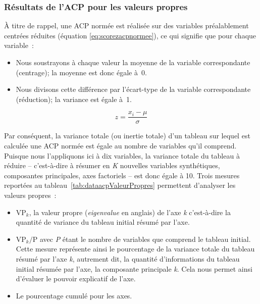 \documentclass[
  11pt,
  french,
]{book}
\providecommand{\tightlist}{%
  \setlength{\itemsep}{0pt}\setlength{\parskip}{0pt}}
\begin{document}
\hypertarget{sect12221}{%
\subsubsection{Résultats de l'ACP pour les valeurs propres}\label{sect12221}}

À titre de rappel, une ACP normée est réalisée sur des variables préalablement centrées réduites (équation \eqref{eq:scorezacpnormee}), ce qui signifie que pour chaque variable~:

\begin{itemize}
\tightlist
\item
  Nous soustrayons à chaque valeur la moyenne de la variable correspondante (centrage); la moyenne est donc égale à~0.
\item
  Nous divisons cette différence par l'écart-type de la variable correspondante (réduction); la variance est égale à~1.
\end{itemize}

\footnotesize

\begin{equation}  
z= \frac{x_i-\mu}{\sigma}
\label{eq:scorezacpnormee}
\end{equation}
\normalsize

Par conséquent, la variance totale (ou inertie totale) d'un tableau sur lequel est calculée une ACP normée est égale au nombre de variables qu'il comprend. Puisque nous l'appliquons ici à dix variables, la variance totale du tableau à réduire -- c'est-à-dire à résumer en \emph{K} nouvelles variables synthétiques, composantes principales, axes factoriels -- est donc égale à 10. Trois mesures reportées au tableau~\ref{tab:dataacpValeurPropres} permettent d'analyser les valeurs propres~:

\begin{itemize}
\tightlist
\item
  \(\mbox{VP}_k\), la valeur propre (\emph{eigenvalue} en anglais) de l'axe \emph{k} c'est-à-dire la quantité de variance du tableau initial résumé par l'axe.
\item
  \(\mbox{VP}_k / \mbox{P}\) avec \emph{P} étant le nombre de variables que comprend le tableau initial. Cette mesure représente ainsi le pourcentage de la variance totale du tableau résumé par l'axe \emph{k}, autrement dit, la quantité d'informations du tableau initial résumée par l'axe, la composante principale \emph{k}. Cela nous permet ainsi d'évaluer le pouvoir explicatif de l'axe.
\item
  Le pourcentage cumulé pour les axes.
\end{itemize}
\end{document}
